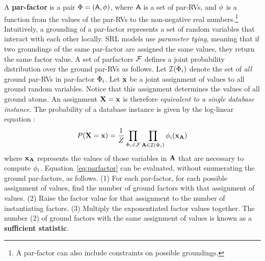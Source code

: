 A \textbf{par-factor} is a pair $\Phi = (\mathsf{A},\phi)$, where $\mathsf{A}$ is a set of par-RVs, and $\phi$ is a function from the values of the par-RVs to the non-negative real numbers.\footnote{A par-factor can also include constraints on possible groundings.} Intuitively, a grounding of a par-factor represents a set of random variables that interact with each other locally. SRL models use {\em parameter tying}, meaning that if two groundings of the same par-factor are assigned the same values, they return the same factor value. A set of parfactors $\mathcal{F}$ defines a joint probability distribution over the ground par-RVs as follows. Let $\mathcal{I}(\Phi_{i})$ denote the set of {\em all} ground par-RVs in par-factor $\Phi_{i}$. Let $\mathbf{x}$ be a joint assignment of values to all ground random variables. Notice that this assignment determines the values of all ground atoms. An assignment $\mathbf{X}=\mathbf{x}$ is therefore {\em equivalent to a single database instance}.
The probability of a database instance is given by the log-linear equation \cite[Eq.7]{Kimmig2015}:
\begin{equation} \label{eq:parfactor}
P(\mathbf{X}=\mathbf{x}) = \frac{1}{Z} \prod_{\Phi_{i} \in \mathcal{F}} \prod_{\mathbf{A} \in \mathcal{I}(\Phi_{i})} 
\phi_{i}(\mathbf{x}_{\mathbf{A}}) 
\end{equation}
where $\mathbf{x}_{\mathbf{A}}$ represents the values of those variables in $\mathbf{A}$ that are necessary to compute $\phi_{i}$. 
Equation~\ref{eq:parfactor} can be evaluated, without enumerating the ground par-factors, 
as follows. 
%
%
(1) For each par-factor, for each possible assignment of values, find the number of ground factors with that assignment of values. (2) Raise the factor value for that assignment to the number of instantiating factors. (3) Multiply the exponentiated factor values together.  The number (2) of ground factors with the same assignment of values is known as a \textbf{sufficient statistic}.

